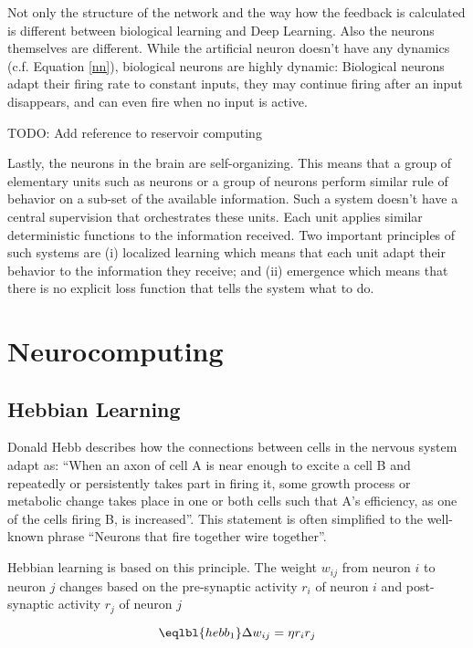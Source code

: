 Not only the structure of the network and the way how the feedback is calculated is different between biological learning and Deep Learning.
Also the neurons themselves are different.
While the artificial neuron doesn't have any dynamics (c.f. Equation \eqref*{nn}), biological neurons are highly dynamic:
Biological neurons adapt their firing rate to constant inputs, they may continue firing after an input disappears, and can even fire when no input is active.

TODO: Add reference to reservoir computing

Lastly, the neurons in the brain are self-organizing.
This means that a group of elementary units such as neurons or a group of neurons perform similar rule of behavior on a sub-set of the available information.
Such a system doesn't have a central supervision that orchestrates these units.
Each unit applies similar deterministic functions to the information received.
Two important principles of such systems are (i) localized learning which means that each unit adapt their behavior to the information they receive; and (ii) emergence which means that there is no explicit loss function that tells the system what to do.


\section{Neurocomputing}

\subsection{Hebbian Learning}
Donald Hebb  describes how the connections between cells in the nervous system adapt as: ``When an axon of cell A is near enough to excite a cell B and repeatedly or persistently takes part in firing it, some growth process or metabolic change takes place in one or both cells such that A’s efficiency, as one of the cells firing B, is increased''. This statement is often simplified to the well-known phrase ``Neurons that fire together wire together''.

Hebbian learning is based on this principle.
The weight \(w_{ij}\) from neuron \(i\) to neuron \(j\) changes based on the pre-synaptic activity \(r_i\) of neuron \(i\) and post-synaptic activity \(r_j\) of neuron \(j\)

\begin{equation}\eqlbl{hebb_1}
	\Delta w_{ij} = \eta r_i r_j
\end{equation}

